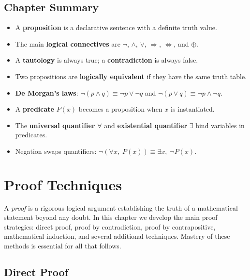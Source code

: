 \documentclass[12pt,a4paper,openany]{book}
\theoremstyle{definition}
\theoremstyle{plain}
\theoremstyle{remark}
\begin{document}
\section{Chapter Summary}
\label{sec:summary-ch1}

\begin{itemize}[nosep]
  \item A \textbf{proposition} is a declarative sentence with a definite truth value.
  \item The main \textbf{logical connectives} are $\lnot$, $\land$, $\lor$,
        $\Rightarrow$, $\Leftrightarrow$, and $\oplus$.
  \item A \textbf{tautology} is always true; a \textbf{contradiction} is always false.
  \item Two propositions are \textbf{logically equivalent} if they have the same truth
        table.
  \item \textbf{De Morgan's laws}: $\lnot(p \land q) \equiv \lnot p \lor \lnot q$
        and $\lnot(p \lor q) \equiv \lnot p \land \lnot q$.
  \item A \textbf{predicate} $P(x)$ becomes a proposition when $x$ is instantiated.
  \item The \textbf{universal quantifier} $\forall$ and \textbf{existential quantifier}
        $\exists$ bind variables in predicates.
  \item Negation swaps quantifiers:
        $\lnot(\forall x,\; P(x)) \equiv \exists x,\; \lnot P(x)$.
\end{itemize}

\chapter{Proof Techniques}
\label{ch:proofs}

A \emph{proof} is a rigorous logical argument establishing the truth of a mathematical
statement beyond any doubt. In this chapter we develop the main proof strategies:
direct proof, proof by contradiction, proof by contrapositive, mathematical induction,
and several additional techniques. Mastery of these methods is essential for all that
follows.

\section{Direct Proof}
\label{sec:direct-proof}
\end{document}
